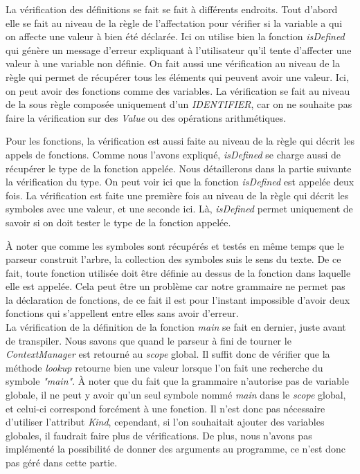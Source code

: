 \documentclass[a4paper]{article}%
\begin{document}
La vérification des définitions se fait se fait à différents endroits. Tout
d'abord elle se fait au niveau de la règle de l'affectation pour vérifier si la
variable a qui on affecte une valeur à bien été déclarée. Ici on utilise bien la
fonction \textit{isDefined} qui génère un message d'erreur expliquant à
l'utilisateur qu'il tente d'affecter une valeur à une variable non définie. On
fait aussi une vérification au niveau de la règle qui permet de récupérer tous
les éléments qui peuvent avoir une valeur. Ici, on peut avoir des fonctions
comme des variables. La vérification se fait au niveau de la sous règle composée
uniquement d'un \textit{IDENTIFIER}, car on ne souhaite pas faire la
vérification sur des \textit{Value} ou des opérations arithmétiques.

Pour les fonctions, la vérification est aussi faite au niveau de la règle qui
décrit les appels de fonctions. Comme nous l'avons expliqué, \textit{isDefined}
se charge aussi de récupérer le type de la fonction appelée. Nous détaillerons
dans la partie suivante la vérification du type. On peut voir ici que la
fonction \textit{isDefined} est appelée deux fois. La vérification est faite une
première fois au niveau de la règle qui décrit les symboles avec une valeur, et
une seconde ici. Là, \textit{isDefined} permet uniquement de savoir si on
doit tester le type de la fonction appelée.

À noter que comme les symboles sont récupérés et testés en même temps que le
parseur construit l'arbre, la collection des symboles suis le sens du texte. De
ce fait, toute fonction utilisée doit être définie au dessus de la fonction dans
laquelle elle est appelée. Cela peut être un problème car notre grammaire ne
permet pas la déclaration de fonctions, de ce fait il est pour l'instant
impossible d'avoir deux fonctions qui s'appellent entre elles sans avoir
d'erreur.\\

La vérification de la définition de la fonction \textit{main} se fait en
dernier, juste avant de transpiler. Nous savons que quand le parseur à fini de
tourner le \textit{ContextManager} est retourné au \textit{scope} global. Il
suffit donc de vérifier que la méthode \textit{lookup} retourne bien une valeur
lorsque l'on fait une recherche du symbole \textit{"main"}. À noter que du fait
que la grammaire n'autorise pas de variable globale, il ne peut y avoir qu'un
seul symbole nommé \textit{main} dans le \textit{scope} global, et celui-ci
correspond forcément à une fonction. Il n'est donc pas nécessaire d'utiliser
l'attribut \textit{Kind}, cependant, si l'on souhaitait ajouter des variables
globales, il faudrait faire plus de vérifications. De plus, nous n'avons pas
implémenté la possibilité de donner des arguments au programme, ce n'est donc
pas géré dans cette partie. %
\end{document}
